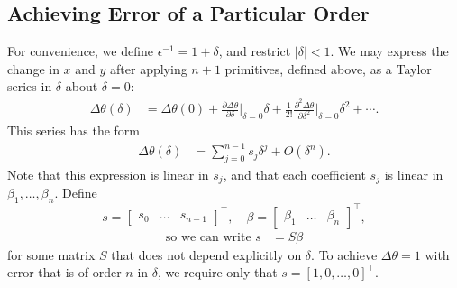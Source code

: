 \documentclass[letter paper, 10pt, conference]{ieeeconf}
\providecommand{\abs}[1]{\lvert#1\rvert}
\begin{document}
\subsection{Achieving Error of a Particular Order}\label{sec:UnicycleErrorOfParticularOrder}

For convenience, we define
$\epsilon^{-1} = 1+\delta$,
and restrict $\abs{\delta}<1$.
We may express the change in $x$ and $y$ after applying $n+1$ primitives, defined above, as a Taylor series in $\delta$ about $\delta=0$:
\begin{align*}
\Delta \theta(\delta) &=
\Delta \theta(0)
+  \frac{\partial \Delta \theta}{\partial \delta}\biggr\rvert_{\delta=0} \delta
+ \frac{1}{2!} \frac{\partial^{2} \Delta \theta}{\partial \delta^{2}}\biggr\rvert_{\delta=0} \delta^{2}
+ \cdots.
\end{align*}
This series has the form
\begin{align*}
\Delta \theta(\delta) &= \sum_{j=0}^{n-1} s_{j} \delta^{j} + O\left(\delta^{n}\right).
\end{align*}
Note that this expression is linear in $s_{j}$, and that each coefficient $s_{j}$ is linear in $\beta_{1},\dotsc,\beta_{n}$.
Define
\[s = \begin{bmatrix} s_{0} &\ldots & s_{n-1} \end{bmatrix}^{\top}, \quad \beta = \begin{bmatrix} \beta_{1} & \ldots & \beta_{n} \end{bmatrix}^{\top},\]
\begin{align}
\label{linearequations}
\text{so we can write } s &= S\beta
\end{align}
for some matrix  $S$ that does not depend explicitly on $\delta$.
To achieve $\Delta \theta=1$ with error that is of order $n$ in $\delta$, we require only that $s = [1, 0,  \ldots, 0 ]^{\top}$.
\end{document}
